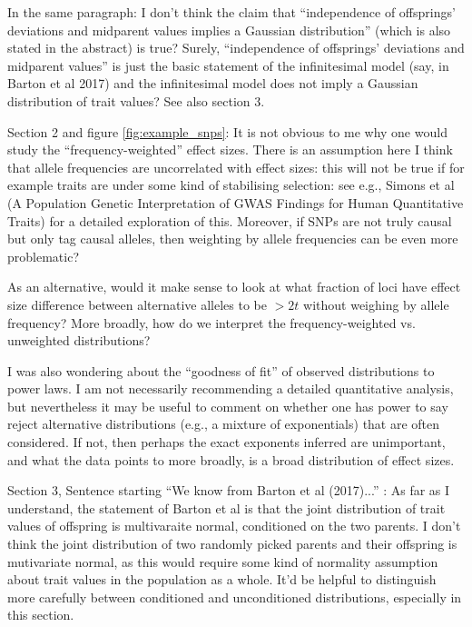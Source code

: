 \reply{
}

\begin{point}{\revref}
In the same paragraph: I don't think the claim that ``independence of offsprings' deviations and midparent values implies a Gaussian distribution'' (which is also stated in the abstract) is true? Surely, ``independence of offsprings' deviations and midparent values'' is just the basic statement of the infinitesimal model (say, in Barton et al 2017) and the infinitesimal model does not imply a Gaussian distribution of trait values? See also section 3.
\end{point}

\reply{
}

\begin{point}{}
    Section 2 and figure \ref{fig:example_snps}: It is not obvious to me why one would study the ``frequency-weighted'' effect sizes. There is an assumption here I think that allele frequencies are uncorrelated with effect sizes: this will not be true if for example traits are under some kind of stabilising selection: see e.g., Simons et al (A Population Genetic Interpretation of GWAS Findings for Human Quantitative Traits) for a detailed exploration of this. Moreover, if SNPs are not truly causal but only tag causal alleles, then weighting by allele frequencies can be even more problematic?

As an alternative, would it make sense to look at what fraction of loci have effect size difference between alternative alleles to be $>2t$ without weighing by allele frequency?
More broadly, how do we interpret the frequency-weighted vs. unweighted distributions?
\end{point}

\reply{
}

\begin{point}{}
I was also wondering about the ``goodness of fit'' of observed distributions to power laws. I am not necessarily recommending a detailed quantitative analysis, but nevertheless it may be useful to comment on whether one has power to say reject alternative distributions (e.g., a mixture of exponentials) that are often considered. If not, then perhaps the exact exponents inferred are unimportant, and what the data points to more broadly, is a broad distribution of effect sizes.
\end{point}

\reply{
}

\begin{point}{}
    Section 3, Sentence starting ``We know from Barton et al (2017)...'' \revref: As far as I understand, the statement of Barton et al is that the joint distribution of trait values of offspring is multivaraite normal, conditioned on the two parents. I don't think the joint distribution of two randomly picked parents and their offspring is mutivariate normal, as this would require some kind of normality assumption about trait values in the population as a whole. It'd be helpful to distinguish more carefully between conditioned and unconditioned distributions, especially in this section.
\end{point}

